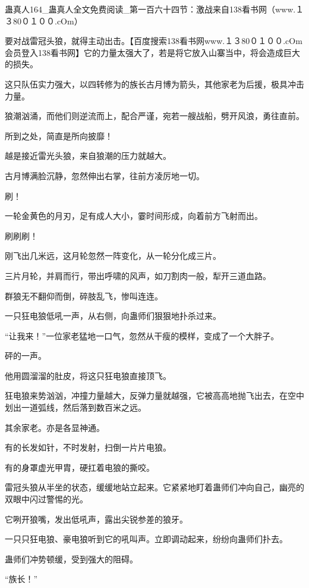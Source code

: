 
\begin{this_body}

蛊真人164\_蛊真人全文免费阅读\_第一百六十四节：激战来自138看书网（www.１３80０１００.cOm）

要对战雷冠头狼，就得主动出击。【百度搜索138看书网www.１３80０１００.cOm 会员登入138看书网】它的力量太强大了，若是将它放入山寨当中，将会造成巨大的损失。

这只队伍实力强大，以四转修为的族长古月博为箭头，其他家老为后援，极具冲击力量。

狼潮汹涌，而他们则逆流而上，配合严谨，宛若一艘战船，劈开风浪，勇往直前。

所到之处，简直是所向披靡！

越是接近雷光头狼，来自狼潮的压力就越大。

古月博满脸沉静，忽然伸出右掌，往前方凌厉地一切。

刷！

一轮金黄色的月刃，足有成人大小，霎时间形成，向着前方飞射而出。

刷刷刷！

刚飞出几米远，这月轮忽然一阵变化，从一轮分化成三片。

三片月轮，并肩而行，带出呼啸的风声，如刀割肉一般，犁开三道血路。

群狼无不翻仰而倒，碎肢乱飞，惨叫连连。

一只狂电狼低吼一声，从右侧，向蛊师们狠狠地扑杀过来。

“让我来！”一位家老猛地一口气，忽然从干瘦的模样，变成了一个大胖子。

砰的一声。

他用圆溜溜的肚皮，将这只狂电狼直接顶飞。

狂电狼来势汹汹，冲撞力量越大，反弹力量就越强，它被高高地抛飞出去，在空中划出一道弧线，然后落到数百米之远。

其余家老。亦是各显神通。

有的长发如针，不时发射，扫倒一片片电狼。

有的身罩虚光甲胄，硬扛着电狼的撕咬。

雷冠头狼从半坐的状态，缓缓地站立起来。它紧紧地盯着蛊师们冲向自己，幽亮的双眼中闪过警惕的光。

它咧开狼嘴，发出低吼声，露出尖锐参差的狼牙。

一只只狂电狼、豪电狼听到它的吼叫声。立即调动起来，纷纷向蛊师们扑去。

蛊师们冲势顿缓，受到强大的阻碍。

“族长！”


\end{this_body}
